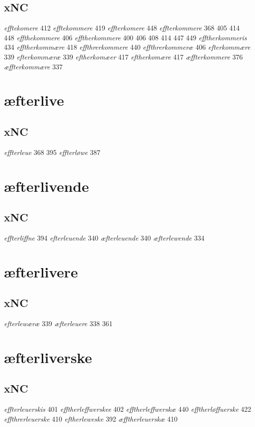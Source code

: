 \documentclass[a4paper,twocolumn]{article}
\begin{document}
\subsection{xNC}
\label{sec:orgdcf7476}
\emph{efftekomere} 412 \emph{efftekommere} 419 \emph{effterkomere} 448 \emph{effterkommere} 368 405 414 448 \emph{effthekommere} 406 \emph{efftherkommere} 400 406 408 414 447 449 \emph{efftherkommeris} 434 \emph{efftherkommære} 418 \emph{effthrerkommere} 440 \emph{effthrerkommeræ} 406 \emph{efterkommære} 339 \emph{efterkommæræ} 339 \emph{eftherkomæer} 417 \emph{eftherkomære} 417 \emph{æffterkommere} 376 \emph{æffterkommære} 337 
\section{æfterlive}
\label{sec:org1c776e5}
\subsection{xNC}
\label{sec:orgf57decb}
\emph{effterleue} 368 395 \emph{effterløwe} 387 
\section{æfterlivende}
\label{sec:orgfa1f188}
\subsection{xNC}
\label{sec:org0b3ec5a}
\emph{effterliffne} 394 \emph{efterleuende} 340 \emph{æfterleuende} 340 \emph{æfterlewende} 334 
\section{æfterlivere}
\label{sec:org99e1a8c}
\subsection{xNC}
\label{sec:orgca0296c}
\emph{efterlewæræ} 339 \emph{æfterleuere} 338 361 
\section{æfterliverske}
\label{sec:org84420d6}
\subsection{xNC}
\label{sec:orgfedd074}
\emph{effterleuerskis} 401 \emph{efftherleffwerskee} 402 \emph{efftherleffwerskæ} 440 \emph{efftherløffuerske} 422 \emph{effthrerleuerske} 410 \emph{eftherleweske} 392 \emph{æfftherleuerskæ} 410 
\end{document}
